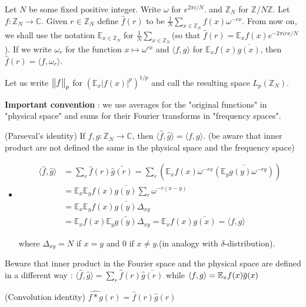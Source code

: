 \documentclass[10pt,a4paper]{report}
\renewcommand{\hat}{\widehat}
\begin{document}
Let $N$ be some fixed positive integer. Write $\omega$ for $e^{2\pi i /N}$. and $\mathbb{Z}_N$ for $\mathbb{Z}/N\mathbb{Z}$. Let $f: \mathbb{Z}_N \rightarrow \mathbb{C}$. Given $r \in \mathbb{Z}_N$ define $\hat{f}(r)$ to be $\frac{1}{N} \sum_{x \in \mathbb{Z}_N} f(x) \omega^{-rx}$. From now on, we shall use the notation $\mathbb{E}_{x\in \mathbb{Z}_N}$ for $\frac{1}{N} \sum_{x \in \mathbb{Z}_N}$(so that $\hat{f}(r)  = \mathbb{E}_x f(x)e^{-2\pi i rx/N}$). If we write $\omega_r$ for the function $x\mapsto \omega^{rx}$ and $\langle f,g \rangle$ for $\mathbb{E}_x f(x)\bar{g(x)}$, then $\hat{f}(r) = \langle f,\omega_r \rangle$.
\s

Let us write $\bigl\lVert f\bigr\rVert_{p}$ for $(\mathbb{E}_x |f(x)|^p)^{1/p}$ and call the resulting space $L_p(\mathbb{Z}_N)$.
\s

\textbf{Important convention} : we use averages for the "original functions" in "physical space" and sums for their Fourier transforms in "frequency spaces".
\s

 (Parseval's identity) If $f,g:\mathbb{Z}_N \rightarrow \mathbb{C}$, then $\langle \hat{f},\hat{g}\rangle =\langle f,g\rangle$. (be aware that inner product are not defined the same in the physical space and the frequency space)
\begin{itemize}
\item[ ] \pf
\begin{align*}
\langle \hat{f},\hat{g} \rangle &= \sum_{r} \hat{f}(r) \bar{\hat{g}(r)} = \sum_r (\mathbb{E}_x f(x)\omega^{-rx} \bar{(\mathbb{E}_y g(y) \omega^{-ry})} ) \\
&= \mathbb{E}_x \mathbb{E}_y f(x)\bar{g(y)} \sum_r \omega^{-r(x-y)} \\
&= \mathbb{E}_x \mathbb{E}_y f(x)\bar{g(y)} \Delta_{xy}\\
&=  \mathbb{E}_x f(x) \mathbb{E}_y \bar{g(y)} \Delta_{xy} = \mathbb{E}_x f(x)\bar{g(x)} = \langle f,g \rangle
\end{align*}

where $\Delta_{xy} = N$ if $x=y$ and $0$ if $x\neq y$.(in analogy with $\delta$-distribution).

\eop
\end{itemize}
\s

Beware that inner product in the Fourier space and the physical space are defined in a different way : $\langle \hat{f},\hat{g} \rangle = \sum_{r} \hat{f}(r) \bar{\hat{g}(r)}$ while $\langle f,g\rangle = \mathbb{E}_x f(x) \overline{g}(x)$
\s

(Convolution identity) $\hat{f * g}(r) = \hat{f}(r) \hat{g}(r)$
\end{document}
